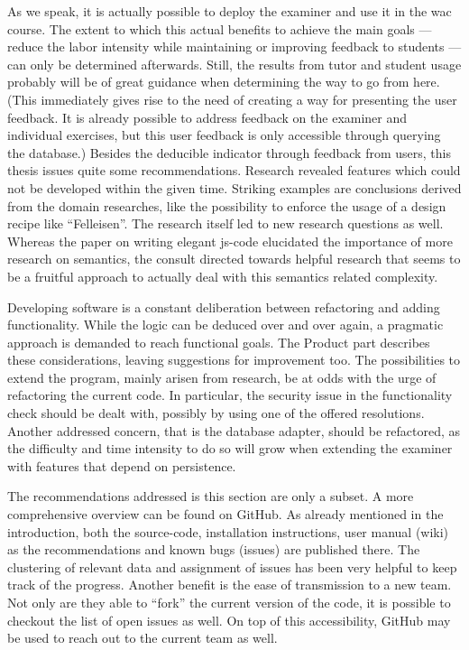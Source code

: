 As we speak, it is actually possible to deploy the \gls{examiner} and use it in 
the \gls{wac} course. The extent to which this actual benefits to achieve 
the main goals
--- reduce the labor intensity while maintaining or improving feedback to 
students --- can only be determined afterwards. Still, the results from 
\gls{tutor} and \gls{student} usage probably will be of great guidance when 
determining the way to go from here. (This immediately gives rise to the need of
creating a way for presenting the user feedback. It is already possible to
address feedback on the \gls{examiner} and individual \glspl{exercise},
but this user feedback is only accessible through querying the database.)
Besides the deducible indicator through feedback from users, this 
thesis issues quite some recommendations. Research revealed
features which could not be developed within the given time. Striking
examples are conclusions derived from the domain researches, like the possibility
to enforce the usage of a design recipe like ``Felleisen''. The research itself
led to new research questions as well. Whereas the paper on writing elegant
\gls{js-code} elucidated the importance of more research on semantics, the
consult directed towards helpful research that seems to be a fruitful approach
to actually deal with this semantics related complexity.


Developing software is a constant deliberation between refactoring and adding
functionality. While the logic can be deduced over and over again, a pragmatic
approach is demanded to reach functional goals. The Product part describes these
considerations, leaving suggestions for improvement too. The possibilities to
extend the program, mainly arisen from research, be at odds with the urge of
refactoring the current code. In particular, the security issue in the 
functionality check should be dealt with, possibly by using one of the offered
resolutions. Another addressed concern, that is the database adapter, should be
refactored, as the difficulty and time intensity to do so will grow when extending
the \gls{examiner} with features that depend on persistence.


The recommendations addressed is this section are only a subset. A more 
comprehensive overview can be found on GitHub. As already mentioned in the 
introduction, both the \gls{source-code}, 
installation instructions, user manual (wiki) as the recommendations and known 
bugs (issues) are published there. The clustering of relevant data and assignment
of issues has been very helpful to keep track of the progress. Another benefit 
is the ease of transmission to a new team. Not only are they able to ``fork'' 
the current version of the code, it is possible to checkout the list of 
open issues as well. On top of this accessibility, GitHub may be used to reach
out to the current team as well.



